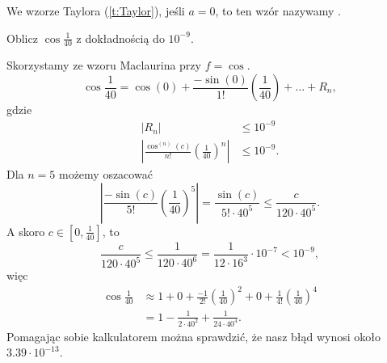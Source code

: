 \begin{definition}
    We wzorze Taylora (\ref{t:Taylor}), jeśli $a = 0$, to ten wzór nazywamy .
\end{definition}

\begin{example}
    Oblicz $\cos\frac{1}{40}$ z dokładnością do $10^{-9}$.
\end{example}
\begin{solution}
    Skorzystamy ze wzoru Maclaurina przy $f = \cos$.
    \[ \cos\frac{1}{40} = \cos(0) + \frac{-\sin(0)}{1!}\left(\frac{1}{40}\right) + \ldots + R_n, \]
    gdzie
    \begin{align*}
        \left|R_n\right| &\leq 10^{-9} \\
        \left|\frac{\cos^{(n)}(c)}{n!}\left(\frac{1}{40}\right)^n\right| &\leq 10^{-9}.
    \end{align*}
    Dla $n = 5$ możemy oszacować
    \[ \left|\frac{-\sin(c)}{5!}\left(\frac{1}{40}\right)^5\right| = \frac{\sin(c)}{5! \cdot 40^5} \leq \frac{c}{120 \cdot 40^5}. \]
    A skoro $c \in [0, \frac{1}{40}]$, to
    \[ \frac{c}{120 \cdot 40^5} \leq \frac{1}{120 \cdot 40^6} = \frac{1}{12 \cdot 16^3} \cdot 10^{-7} < 10^{-9}, \]
    więc
    \begin{align*}
        \cos\frac{1}{40} &\approx 1 + 0 + \frac{-1}{2!}\left(\frac{1}{40}\right)^2 + 0 + \frac{1}{4!}\left(\frac{1}{40}\right)^4 \\
        &= 1 - \frac{1}{2 \cdot 40^2} + \frac{1}{24 \cdot 40^4}.
    \end{align*}
    Pomagając sobie kalkulatorem można sprawdzić, że nasz błąd wynosi około $3.39\cdot 10^{-13}$.
\end{solution}